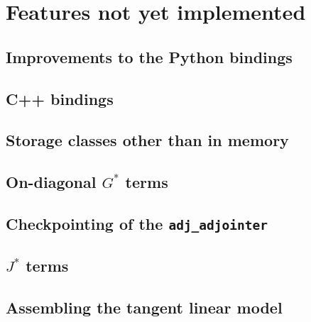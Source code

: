 \chapter{Features not yet implemented}
\section{Improvements to the Python bindings}
\section{C++ bindings}
\section{Storage classes other than in memory}
\section{On-diagonal $G^*$ terms}
\section{Checkpointing of the \texttt{adj_adjointer}}
\section{$J^*$ terms}
\section{Assembling the tangent linear model}
